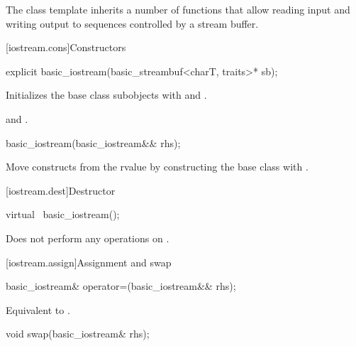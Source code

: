 \pnum
The class template
inherits a number of functions that allow reading input and writing output to
sequences controlled by a stream buffer.

[iostream.cons]{Constructors}

%
\begin{itemdecl}
explicit basic_iostream(basic_streambuf<charT, traits>* sb);
\end{itemdecl}

\begin{itemdescr}
\pnum
\effects
Initializes the base class subobjects with
and
.

\pnum
\ensures
{}
and
.
\end{itemdescr}

%
\begin{itemdecl}
basic_iostream(basic_iostream&& rhs);
\end{itemdecl}

\begin{itemdescr}
\pnum
\effects
Move constructs from the rvalue  by
constructing the  base class with
.
\end{itemdescr}

[iostream.dest]{Destructor}

%
\begin{itemdecl}
virtual ~basic_iostream();
\end{itemdecl}

\begin{itemdescr}
\pnum
\remarks
Does not perform any operations on
.
\end{itemdescr}

[iostream.assign]{Assignment and swap}

%
\begin{itemdecl}
basic_iostream& operator=(basic_iostream&& rhs);
\end{itemdecl}

\begin{itemdescr}
\pnum
\effects
Equivalent to .
\end{itemdescr}

%
\begin{itemdecl}
void swap(basic_iostream& rhs);
\end{itemdecl}

